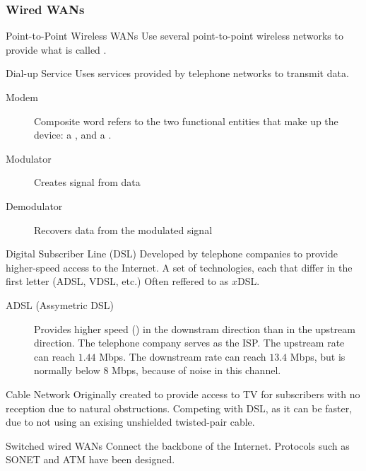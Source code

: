 \documentclass[\main/notes.tex]{subfiles}
\begin{document}
				\subsubsection{Wired WANs}
					\begin{definition}{Point-to-Point Wireless WANs}
						Use several point-to-point wireless networks to provide what is called .
					\end{definition}
					\begin{definition}{Dial-up Service}
						Uses services provided by telephone networks to transmit data.
						\begin{indentparagraph}
							\begin{description}
								\item[Modem] Composite word refers to the two functional entities that make up the device: a , and a .
								\item[Modulator] Creates signal from data
								\item[Demodulator] Recovers data from the modulated signal
							\end{description}
						\end{indentparagraph}
					\end{definition}
					\begin{definition}{Digital Subscriber Line (DSL)}
						Developed by telephone companies to provide higher-speed access to the Internet. A set of technologies, each that differ in the first letter (ADSL, VDSL, etc.) Often reffered to as $x$DSL.
						\begin{indentparagraph}
							\begin{description}
								\item[ADSL (Assymetric DSL)] Provides higher speed () in the downstram direction than in the upstream direction. The telephone company serves as the ISP. The upstream rate can reach $1.44$ Mbps. The downstream rate can reach $13.4$ Mbps, but is normally below $8$ Mbps, because of noise in this channel.
							\end{description}
						\end{indentparagraph}
					\end{definition}
					\begin{definition}{Cable Network}
						Originally created to provide access to TV for subscribers with no reception due to natural obstructions. Competing with DSL, as it can be faster, due to not using an exising unshielded twisted-pair cable.
					\end{definition}
					\begin{definition}{Switched wired WANs}
						Connect the backbone of the Internet. Protocols such as SONET and ATM have been designed.
					\end{definition}
				\pagebreak
\end{document}
